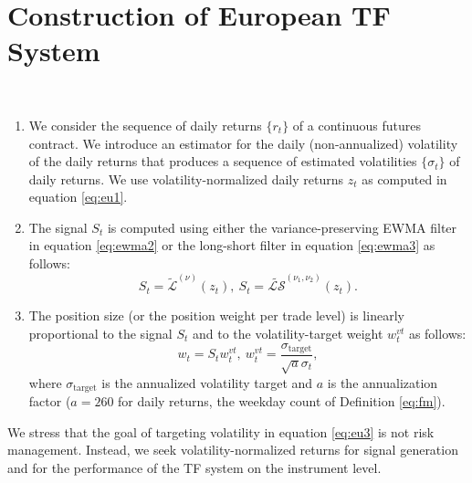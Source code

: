 \documentclass[hidelinks]{siamonline250211}
\begin{document}
\section{Construction of European TF System}\label{sc:eft}


\begin{definition}\label{as:eu} ~
	
	
	\begin{enumerate}
		
		\item We consider the sequence of daily returns $\{r_{t}\}$ of a continuous futures contract. We introduce an estimator for the daily (non-annualized) volatility of the daily returns that produces a sequence of estimated volatilities $\{\sigma_{t}\}$ of daily returns. We use volatility-normalized daily returns $z_{t}$ as computed in equation \eqref{eq:eu1}.
		
		
		\item The signal $S_{t}$ is computed using either the variance-preserving EWMA filter in equation \eqref{eq:ewma2} or the long-short filter in equation \eqref{eq:ewma3} as follows:
		\begin{equation} \label{eq:eu2} 
			S_{t} = \widetilde{\mathcal{L}}^{(\nu)} (z_{t}) , \ S_{t} = \widetilde{\mathcal{LS}}^{(\nu_{1}, \nu_{2})} (z_{t}). 
		\end{equation}
		
		\item The position size (or the position weight per trade level) is linearly proportional to the signal $S_{t}$ and to the volatility-target weight $w^{vt}_{t}$ as follows:
		\begin{equation} \label{eq:eu3} 
			w_{t} =  S_{t}w^{vt}_{t}, \ w^{vt}_{t}=\frac{\sigma_{\mathrm{target}}}{\sqrt{a}\sigma_{t}}, 
		\end{equation}
		where $\sigma_{\mathrm{target}}$ is the annualized volatility target and $a$ is the annualization factor ($a=260$ for daily returns, the weekday count of Definition \ref{eq:fm}).
		
	\end{enumerate}
	
\end{definition} 


We stress that the goal of targeting volatility in equation \eqref{eq:eu3} is not risk management. Instead, we seek volatility-normalized returns for signal generation and for the performance of the TF system on the instrument level. 	
\end{document}
